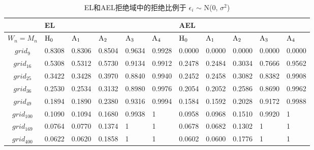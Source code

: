 \documentclass[onecolumn]{ctexart}	%
\begin{document}
\begin{table}[H]
\setlength{\abovecaptionskip}{0.cm}%
\centering
\caption{EL和AEL拒绝域中的拒绝比例于 $\epsilon_{i}$ $\sim$ N(0, $\sigma^2$)}
\begin{tabular*}{\hsize}{@{}@{\extracolsep{\fill}}cllllllllll@{}}
\hline
  &EL&&&&&AEL&&\\
\hline
  $W_n=M_n$ & $\rm{H_0}$ & $\rm{A_1}$ & $\rm{A_2}$ & $\rm{A_3}$ & $\rm{A_4}$ & $\rm{H_0}$ & $\rm{A_1}$ &$\rm{A_2}$ & $\rm{A_3}$& $\rm{A_4}$\\
\hline
$grid_{9}$  & 0.8308 & 0.8306 & 0.8504 & 0.9634 & 0.9928 & 0.0000 & 0.0000 & 0.0000 & 0.0000 &0.0000\\
$grid_{16}$  &  0.5308 & 0.5312 & 0.5730 & 0.9134  & 0.9912 & 0.2478 & 0.2484 & 0.3034 & 0.7666& 0.9562\\
$grid_{25}$   & 0.3422 & 0.3428 & 0.3970 & 0.8840 & 0.9940 & 0.2452 & 0.2458 & 0.3082 & 0.8382&0.9908\\
$grid_{36}$   & 0.2530 & 0.2534 & 0.3132 & 0.8980 & 0.9976 & 0.2054 & 0.2052 & 0.2586 & 0.8690& 0.9962\\
$grid_{49}$   & 0.1894 & 0.1890 & 0.2380 & 0.9316 & 0.9994 & 0.1584 & 0.1592 & 0.2028 & 0.9172& 0.9988\\
$grid_{100}$  &  0.1090 & 0.1094 & 0.1680 & 0.9938 &  1 & 0.0958 & 0.0968 & 0.1510 & 0.9920& 1  \\
$grid_{169}$  &  0.0764 & 0.0770 & 0.1374 & 1  &  1 & 0.0678 & 0.0682 & 0.1302 & 1 & 1  \\
$grid_{400}$  &  0.0622 & 0.0620 & 0.1858 & 1  &  1 & 0.0602 & 0.0600 & 0.1776 & 1 & 1  \\
\hline
\end{tabular*}
\end{table}
\end{document}
